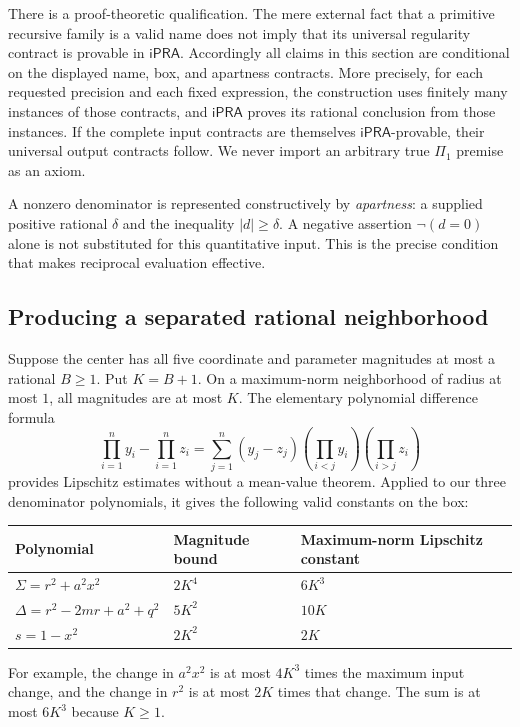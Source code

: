 \documentclass[11pt,a4paper]{article}
\numberwithin{equation}{section}
\theoremstyle{definition}\newtheorem{definition}[theorem]{Definition}
\theoremstyle{remark}\newtheorem{remark}[theorem]{Remark}
\newcommand{\ipra}{\mathsf{iPRA}}
\begin{document}
There is a proof-theoretic qualification. The mere external fact that a primitive recursive family is a valid name does not imply that its universal regularity contract is provable in $\ipra$. Accordingly all claims in this section are conditional on the displayed name, box, and apartness contracts. More precisely, for each requested precision and each fixed expression, the construction uses finitely many instances of those contracts, and $\ipra$ proves its rational conclusion from those instances. If the complete input contracts are themselves $\ipra$-provable, their universal output contracts follow. We never import an arbitrary true $\Pi_1$ premise as an axiom.

A nonzero denominator is represented constructively by \emph{apartness}: a supplied positive rational $\delta$ and the inequality $|d|\ge\delta$. A negative assertion $\neg(d=0)$ alone is not substituted for this quantitative input. This is the precise condition that makes reciprocal evaluation effective.

\subsection{Producing a separated rational neighborhood}
Suppose the center has all five coordinate and parameter magnitudes at most a rational $B\ge1$. Put $K=B+1$. On a maximum-norm neighborhood of radius at most $1$, all magnitudes are at most $K$. The elementary polynomial difference formula
\[
 \prod_{i=1}^n y_i-\prod_{i=1}^n z_i
 =\sum_{j=1}^n(y_j-z_j)
       \left(\prod_{i<j}y_i\right)\left(\prod_{i>j}z_i\right)
\]
provides Lipschitz estimates without a mean-value theorem. Applied to our three denominator polynomials, it gives the following valid constants on the box:
\begin{center}
\begin{tabular}{lll}\toprule
Polynomial & Magnitude bound & Maximum-norm Lipschitz constant\\\midrule
$\Sigma=r^2+a^2x^2$ & $2K^4$ & $6K^3$\\
$\Delta=r^2-2mr+a^2+q^2$ & $5K^2$ & $10K$\\
$s=1-x^2$ & $2K^2$ & $2K$\\\bottomrule
\end{tabular}
\end{center}
For example, the change in $a^2x^2$ is at most $4K^3$ times the maximum input change, and the change in $r^2$ is at most $2K$ times that change. The sum is at most $6K^3$ because $K\ge1$.
\end{document}
